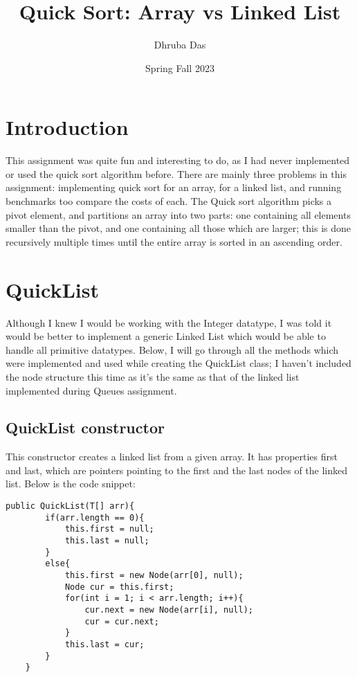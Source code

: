 \documentclass[a4paper,11pt]{article}
\begin{document}
\title{
    \textbf{Quick Sort: Array vs Linked List}
}
\author{Dhruba Das}
\date{Spring Fall 2023}

\maketitle

\section*{Introduction}
This assignment was quite fun and interesting to do, as I had never implemented or used the quick sort algorithm before. There are mainly three problems in this assignment: implementing quick sort for an array, for a linked list, and running benchmarks too compare the costs of each.
The Quick sort algorithm picks a pivot element, and partitions an array into two parts: one containing all elements smaller than the pivot, and one containing all those which are larger; this is done recursively multiple times until the entire array is sorted in an ascending order.


\section*{QuickList}
Although I knew I would be working with the Integer datatype, I was told it would be better to implement a generic Linked List which would be able to handle all primitive datatypes. Below, I will go through all the methods which were implemented and used while creating the QuickList class; I haven't included the node structure this time as it's the same as that of the linked list implemented during Queues assignment.


\subsection*{QuickList constructor}
This constructor creates a linked list from a given array. It has properties first and last, which are pointers pointing to the first and the last nodes of the linked list. Below is the code snippet:

\begin{verbatim}
public QuickList(T[] arr){ 
        if(arr.length == 0){
            this.first = null;
            this.last = null;
        } 
        else{
            this.first = new Node(arr[0], null);
            Node cur = this.first;
            for(int i = 1; i < arr.length; i++){
                cur.next = new Node(arr[i], null);
                cur = cur.next;
            }
            this.last = cur;
        }
    }
\end{verbatim}
\end{document}
